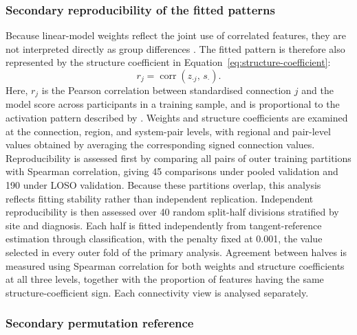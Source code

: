 \subsubsection{Secondary reproducibility of the fitted patterns}
\label{subsubsec:pattern-reproducibility}

Because linear-model weights reflect the joint use of correlated features, they are not interpreted directly as group differences \citep{Haufeetal2014}. The fitted pattern is therefore also represented by the structure coefficient in Equation~\eqref{eq:structure-coefficient}:
\begin{equation}
r_j = \operatorname{corr}\!\left(z_{\cdot j},\, s_{\cdot}\right).
\label{eq:structure-coefficient}
\end{equation}
Here, $r_j$ is the Pearson correlation between standardised connection $j$ and the model score across participants in a training sample, and is proportional to the activation pattern described by \citet{Haufeetal2014}. Weights and structure coefficients are examined at the connection, region, and system-pair levels, with regional and pair-level values obtained by averaging the corresponding signed connection values. Reproducibility is assessed first by comparing all pairs of outer training partitions with Spearman correlation, giving 45 comparisons under pooled validation and 190 under LOSO validation. Because these partitions overlap, this analysis reflects fitting stability rather than independent replication. Independent reproducibility is then assessed over 40 random split-half divisions stratified by site and diagnosis. Each half is fitted independently from tangent-reference estimation through classification, with the penalty fixed at 0.001, the value selected in every outer fold of the primary analysis. Agreement between halves is measured using Spearman correlation for both weights and structure coefficients at all three levels, together with the proportion of features having the same structure-coefficient sign. Each connectivity view is analysed separately.

\subsubsection{Secondary permutation reference}
\label{subsubsec:interpretation-permutation}

